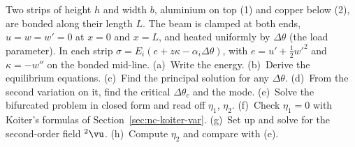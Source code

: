 
\label{exo:rd-bimetal}
%
Two strips of height $h$ and width $b$, aluminium on top (1) and copper below (2), are bonded along
their length $L$. The beam is clamped at both ends, $u = w = w' = 0$ at $x = 0$ and $x = L$, and heated
uniformly by $\Delta\theta$ (the load parameter). In each strip $\sigma = E_i(e + z\kappa - \alpha_i\Delta\theta)$, with
$e = u' + \tfrac12 w'^2$ and $\kappa = -w''$ on the bonded mid-line.
(a)~Write the energy. (b)~Derive the equilibrium equations. (c)~Find the principal solution for any
$\Delta\theta$. (d)~From the second variation on it, find the critical $\Delta\theta_c$ and the mode.
(e)~Solve the bifurcated problem in closed form and read off $\eta_1$, $\eta_2$. (f)~Check $\eta_1 = 0$ with
Koiter's formulas of Section~\ref{sec:nc-koiter-var}. (g)~Set up and solve for the second-order field
${}^2\vu$. (h)~Compute $\eta_2$ and compare with (e).

